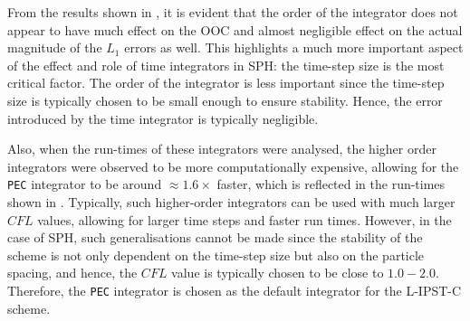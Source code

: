 From the results shown in , it is evident that the order of the integrator does not appear to have much effect on the OOC and almost negligible effect on the actual magnitude of the $L_1$ errors as well.
This highlights a much more important aspect of the effect and role of time integrators in SPH: the time-step size is the most critical factor. The order of the integrator is less important since the time-step size is typically chosen to be small enough to ensure stability. Hence, the error introduced by the time integrator is typically negligible.

Also, when the run-times of these integrators were analysed, the higher order integrators were observed to be more computationally expensive, allowing for the \texttt{PEC} integrator to be around $\approx 1.6\times$ faster, which is reflected in the run-times shown in .
Typically, such higher-order integrators can be used with much larger $CFL$ values, allowing for larger time steps and faster run times. However, in the case of SPH, such generalisations cannot be made since the stability of the scheme is not only dependent on the time-step size but also on the particle spacing, and hence, the $CFL$ value is typically chosen to be close to $1.0-2.0$.
Therefore, the \texttt{PEC} integrator is chosen as the default integrator for the L-IPST-C scheme.

